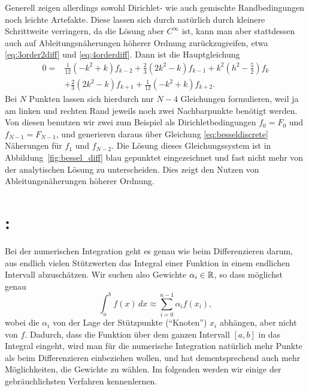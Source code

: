 Generell zeigen allerdings sowohl Dirichlet- wie auch gemischte
Randbedingungen noch leichte Artefakte. Diese lassen sich durch
natürlich durch kleinere Schrittweite verringern, da die Lösung aber
$C^\infty$ ist, kann man aber stattdessen auch auf
Ableitungsnäherungen höherer Ordnung zurückzugreifen, etwa
\eqref{eq:3order2diff} und \eqref{eq:4orderdiff}. Dann ist die
Hauptgleichung
\begin{align}
  0 = &\frac{1}{12}(-k^2 + k)f_{k-2}
  + \frac{2}{3}(2k^2 - k)f_{k-1}
  + k^2\left(h^2 - \frac{5}{2}\right)f_k\nonumber\\
  &+ \frac{2}{3}(2k^2 - k)f_{k+1}
  + \frac{1}{12}(-k^2 + k)f_{k+2}.
\end{align}
Bei $N$ Punkten lassen sich hierdurch nur $N-4$ Gleichungen
formulieren, weil ja am linken und rechten Rand jeweils noch zwei
Nachbarpunkte benötigt werden. Von diesen benutzen wir zwei zum
Beispiel als Dirichletbedingungen $f_0 = F_0$ und $f_{N-1} = F_{N-1}$,
und generieren daraus über Gleichung \eqref{eq:besseldiscrete}
Näherungen für $f_1$ und $f_{N-2}$. Die Lösung dieses Gleichungssystem
ist in Abbildung~\ref{fig:bessel_diff} blau gepunktet eingezeichnet
und fast nicht mehr von der analytischen Lösung zu unterscheiden. Dies
zeigt den Nutzen von Ableitungsnäherungen höherer Ordnung.

\afterpage{\raggedbottom
  
  \clearpage
}

\section{: }

Bei der numerischen Integration geht es genau wie beim Differenzieren
darum, aus endlich vielen Stützwerten das Integral einer Funktion in
einem endlichen Intervall abzuschätzen. Wir suchen also Gewichte
$\alpha_{i}\in\mathbb{R}$, so dass möglichst genau
\begin{equation}
  \int_a^b f(x)\, dx \approx \sum_{i=0}^{n-1} \alpha_if(x_i),
\end{equation}
wobei die $\alpha_i$ von der Lage der Stützpunkte ("`Knoten"') $x_i$
abhängen, aber nicht von $f$. Dadurch, dass die Funktion über dem
ganzen Intervall $[a,b]$ in das Integral eingeht, wird man für die
numerische Integration natürlich mehr Punkte als beim Differenzieren
einbeziehen wollen, und hat dementsprechend auch mehr Möglichkeiten,
die Gewichte zu wählen. Im folgenden werden wir einige der
gebräuchlichsten Verfahren kennenlernen.

